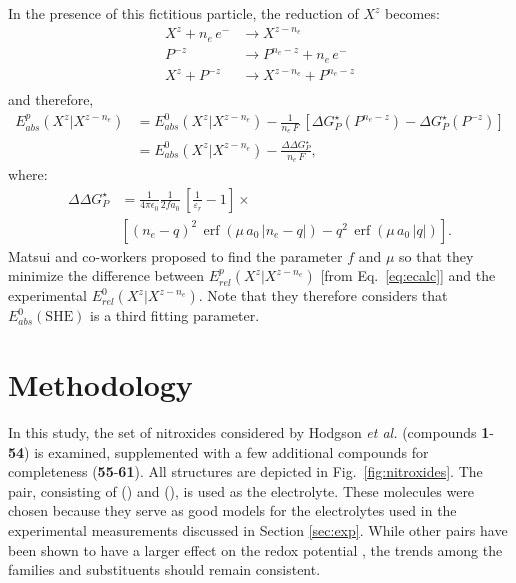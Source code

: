 \documentclass[review,preprint]{elsarticle}
\DeclareMathOperator{\erf}{erf}
\begin{document}
In the presence of this fictitious particle, the reduction of $X^z$ becomes:\begin{equation*}
	\begin{array}{rl}
		X^z + n_e\,e^- &\rightarrow X^{z-n_e} \\
		P^{-z} \phantom{ + n_e\,e^-} &\rightarrow P^{n_e-z} + n_e\,e^- \\
		\hline
		X^z + P^{-z}&\rightarrow X^{z-n_e} +P^{n_e-z}\\
	\end{array}  \label{eq:corr}
\end{equation*}
and therefore,\begin{align}
	E^p_{abs}(X^z|X^{z-n_e}) &= 	E_{abs}^0(X^{z}|X^{z-n_e}) -\frac{1}{n_e\,F}\,[\Delta G^\star_{P}(P^{n_e-z}) - \Delta G^\star_{P}(P^{-z})] \nonumber\\
	&= 	E_{abs}^0(X^{z}|X^{z-n_e}) -\frac{\Delta\Delta G^\star_P}{n_e\,F}, \label{eq:matsui} 
\end{align}
where:\begin{align*}
	\Delta\Delta G^\star_P&=\frac{1}{4\pi\epsilon_0}\frac{1}{2fa_0}\,\left[\frac{1}{\varepsilon_r}-1\right]\times\nonumber\\
	&\left[ (n_e-q)^2\,\erf(\mu\,a_0\,|n_e-q|)-q^2\,\erf(\mu\,a_0\,|q|)\right].
\end{align*}
Matsui and co-workers proposed to  find the parameter $f$ and $\mu$ so that they minimize the difference between $E^p_{rel}(X^z|X^{z-n_e})$  [from Eq.~\eqref{eq:ecalc}] and the experimental $E^0_{rel}(X^z|X^{z-n_e})$.  Note that they therefore considers that $ E^{0}_{abs}(\text{SHE})$ is a third fitting parameter.

\section{Methodology} \label{sec:methodo}

In this study, the set of nitroxides considered by Hodgson \textit{et al.} (compounds \textbf{1}-\textbf{54}) is examined, supplemented with a few additional compounds for completeness (\textbf{55}-\textbf{61}). All structures are depicted in Fig.~\ref{fig:nitroxides}. The  pair, consisting of  () and  (), is used as the electrolyte. These molecules were chosen because they serve as good models for the electrolytes used in the experimental measurements discussed in Section \ref{sec:exp}. While other pairs have been shown to have a larger effect on the redox potential \cite{wylieImprovedPerformanceAllOrganic2019a}, the trends among the families and substituents should remain consistent.
\end{document}
